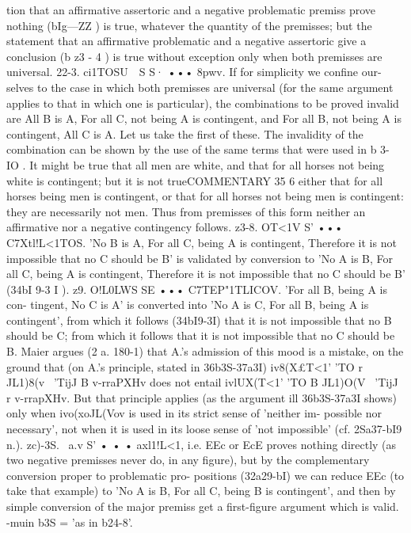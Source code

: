 {{{{{{{{{tion that an affirmative assertoric and a negative problematic
premiss prove nothing (bIg---ZZ ) is true, whatever the quantity of
the premisses; but the statement that an affirmative problematic
and a negative assertoric give a conclusion (b z3 - 4 ) is true without
exception only when both premisses are universal.
22-3. ci1TOSU~~S S· ••• 8pwv. If for simplicity we confine our-
selves to the case in which both premisses are universal (for the
same argument applies to that in which one is particular), the
combinations to be proved invalid are All B is A, For all C, not
being A is contingent, and For all B, not being A is contingent,
All C is A. Let us take the first of these. The invalidity of the
combination can be shown by the use of the same terms that
were used in b 3- IO . It might be true that all men are white, and
that for all horses not being white is contingent; but it is not trueCOMMENTARY
35 6
either that for all horses being men is contingent, or that for all
horses not being men is contingent: they are necessarily not men.
Thus from premisses of this form neither an affirmative nor a
negative contingency follows.
z3-8. OT<1V S' ••• C7Xtl!L<1TOS. 'No B is A, For all C, being A is
contingent, Therefore it is not impossible that no C should be B'
is validated by conversion to 'No A is B, For all C, being A is
contingent, Therefore it is not impossible that no C should be B'
(34bI 9-3 I ).
z9. O!L0LWS SE ••• C7TEP"1TLICOV.
'For all B, being A is con-
tingent, No C is A' is converted into 'No A is C, For all B, being
A is contingent', from which it follows (34bI9-3I) that it is not
impossible that no B should be C; from which it follows that it is
not impossible that no C should be B. Maier argues (2 a. 180-1)
that A.'s admission of this mood is a mistake, on the ground that
(on A.'s principle, stated in 36b3S-37a3I) iv8(X£T<1' 'TO r JL1)8(v~ 'TijJ
B v-rraPXHv does not entail ivlUX(T<1' 'TO B JL1)O(V~ 'TijJ r v-rrapXHv. But
that principle applies (as the argument ill 36b3S-37a3I shows)
only when ivo(xoJL(Vov is used in its strict sense of 'neither im-
possible nor necessary', not when it is used in its loose sense of
'not impossible' (cf. 2Sa37-bI9 n.).
zc)-3S. ~a.v S' • • • axl1!L<1, i.e. EEc or EcE proves nothing
directly (as two negative premisses never do, in any figure), but
by the complementary conversion proper to problematic pro-
positions (32a29-bI) we can reduce EEc (to take that example)
to 'No A is B, For all C, being B is contingent', and then by
simple conversion of the major premiss get a first-figure argument
which is valid. -mu\w in b3S = 'as in b24-8'.
}}}}}}}}}
